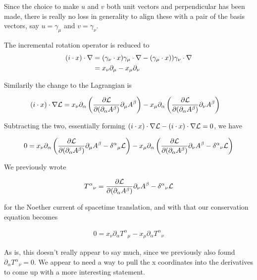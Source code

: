 Since the choice to make $u$ and $v$ both unit vectors and perpendicular has been made, there is really no loss in generality to align these with a pair of the basis vectors, say $u = \gamma_\mu$ and $v = \gamma_\nu$.

The incremental rotation operator is reduced to
\begin{align*}
(i \cdot x) \cdot \nabla 
&=
(\gamma_\nu \cdot x) \gamma_\mu \cdot \nabla - (\gamma_\mu \cdot x)) \gamma_\nu \cdot \nabla \\
&=
x_\nu \partial_\mu - x_\mu \partial_\nu \\
\end{align*}

Similarily the change to the Lagrangian is

\begin{align}\label{eqn:rotationCurrents:foo5}
(i \cdot x) \cdot \nabla \mathcal{L}
&=
x_\nu
\partial_\alpha \left(
\frac{\partial {\mathcal{L}}}{\partial {(\partial_\alpha A^\beta)}} \partial_\mu {A^\beta}
\right) 
-
x_\mu
\partial_\alpha \left(
\frac{\partial {\mathcal{L}}}{\partial {(\partial_\alpha A^\beta)}} \partial_\nu {A^\beta}
\right) 
\end{align}

Subtracting the two, essentially forming $(i \cdot x) \cdot \nabla \mathcal{L} - (i \cdot x) \cdot \nabla \mathcal{L} = 0$, we have

\begin{align}\label{eqn:rotationCurrents:foo6}
0 =
x_\nu
\partial_\alpha \left(
\frac{\partial {\mathcal{L}}}{\partial {(\partial_\alpha A^\beta)}} \partial_\mu {A^\beta}
- {\delta^\alpha}_\mu \mathcal{L}
\right) 
-
x_\mu
\partial_\alpha \left(
\frac{\partial {\mathcal{L}}}{\partial {(\partial_\alpha A^\beta)}} \partial_\nu {A^\beta}
- {\delta^\alpha}_\nu \mathcal{L}
\right) 
\end{align}

We previously wrote 

\begin{align*}
{T^\alpha}_\nu &= \frac{\partial {\mathcal{L}}}{\partial {(\partial_\alpha A^\beta)}} \partial_\nu A^\beta - {\delta^\alpha}_\nu \mathcal{L} \\
\end{align*}

for the Noether current of spacetime translation, and with that our conservation equation becomes

\begin{align}\label{eqn:rotationCurrents:foo7}
0 = x_\nu \partial_\alpha {T^\alpha}_\mu - x_\mu \partial_\alpha {T^\alpha}_\nu
\end{align}

As is, this doesn't really appear to say much, since we previously also found $\partial_\alpha {T^\alpha}_\nu = 0$.  We appear to need a way to pull the x coordinates into the derivatives to come up with a more interesting statement.

\EndArticle
